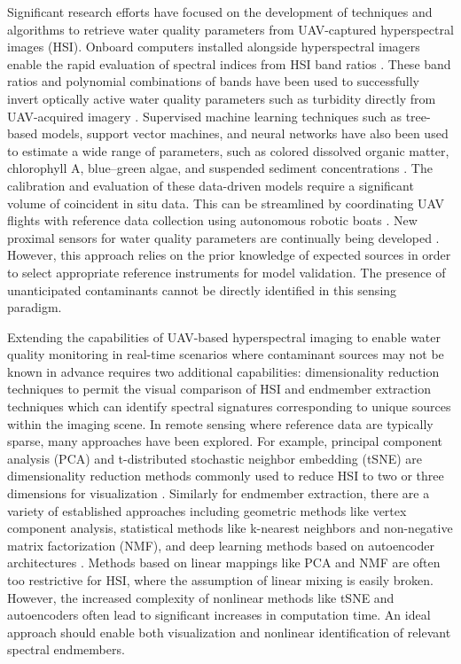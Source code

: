 Significant research efforts have focused on the development of techniques and algorithms to retrieve water quality parameters from UAV-captured hyperspectral images (HSI). Onboard computers installed alongside hyperspectral imagers enable the rapid evaluation of spectral indices from HSI band ratios \cite{horstrand2019uav}. These band ratios and polynomial combinations of bands have been used to successfully invert optically active water quality parameters such as turbidity directly from UAV-acquired imagery \cite{vogt2016near, zhang2022selection}. Supervised machine learning techniques such as tree-based models, support vector machines, and neural networks have also been used to estimate a wide range of parameters, such as colored dissolved organic matter, chlorophyll A, blue--green algae, and suspended sediment concentrations \cite{keller2018hyperspectral, lu2021retrieval}. %
The calibration and evaluation of these data-driven models require a significant volume of coincident in situ data. This can be streamlined by coordinating UAV flights with reference data collection using autonomous robotic boats \cite{robot-team-1, robot-team-2}. New proximal sensors for water quality parameters are continually being developed \cite{proximal-sensing-1, proximal-sensing-2}. However, this approach relies on the prior knowledge of expected sources in order to select appropriate reference instruments for model validation. The presence of unanticipated contaminants cannot be directly identified in this sensing paradigm.

Extending the capabilities of UAV-based hyperspectral imaging to enable water quality monitoring in real-time scenarios where contaminant sources may not be known in advance requires two additional capabilities: dimensionality reduction techniques to permit the visual comparison of HSI and endmember extraction techniques which can identify spectral signatures corresponding to unique sources within the imaging scene. In remote sensing where reference data are typically sparse, many approaches have been explored. For example, principal component analysis (PCA) and t-distributed stochastic neighbor embedding (tSNE) are dimensionality reduction methods commonly used to reduce HSI to two or three dimensions for visualization \cite{tyo2003principal,zhang2015hyperspectral}. Similarly for endmember extraction, there are a variety of established approaches including geometric methods like vertex component analysis, statistical methods like k-nearest neighbors and non-negative matrix factorization (NMF), and deep learning methods based on autoencoder architectures \cite{heylen2014review,vca-orig, unmixing-nmf-review-2, cariou2015unsupervised, su2019daen, borsoi2019deep, palsson2020convolutional}. Methods based on linear mappings like PCA and NMF are often too restrictive for HSI, where the assumption of linear mixing is easily broken. However, the increased complexity of nonlinear methods like tSNE and autoencoders often lead to significant increases in computation time. An ideal approach should enable both visualization and nonlinear identification of relevant spectral endmembers.

